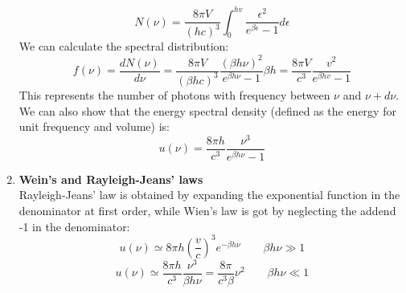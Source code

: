 \begin{enumerate}
    $$ N(\nu) = \frac{8\pi V}{(hc)^3} \int_0^{hv} \frac{\epsilon^2}{e^{\beta \epsilon}-1}d\epsilon$$
    We can calculate the spectral distribution:
    $$f(\nu) = \frac{dN(\nu)}{d\nu} = \frac{8\pi V}{(\beta h c)^3}\frac{(\beta h \nu)^2}{e^{\beta h \nu}-1} \beta h = \frac{8\pi V}{c^3}\frac{v^2}{e^{\beta h v}-1}$$
    This represents the number of photons with frequency between $\nu$ and $\nu + d\nu$.
    We can also show that the energy spectral density (defined as the energy for unit frequency and volume) is:
    $$u(\nu) = \frac{8\pi h}{c^3} \frac{\nu^3}{e^{\beta h \nu}-1}$$
    \item \textbf{Wein's and Rayleigh-Jeans' laws}\\
    Rayleigh-Jeans' law is obtained by expanding the exponential function in the denominator at first order, while Wien's law is got by neglecting the addend -1 in the denominator:
    $$u(\nu) \simeq 8\pi h\left(\frac vc\right)^3 e^{-\beta h \nu} \qquad \beta h \nu \gg 1$$
    $$ u(\nu) \simeq \frac{8\pi h}{c^3} \frac{\nu^3}{\beta h \nu} = \frac{8\pi}{c^3\beta} \nu^2 \qquad \beta h \nu \ll 1$$
\end{enumerate}
